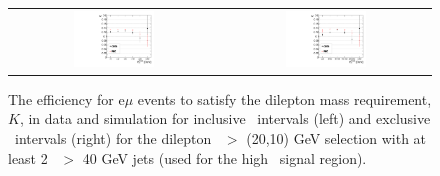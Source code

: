 \clearpage

\begin{figure}[!ht]
\begin{center}
\begin{tabular}{cc}
\includegraphics[width=0.4\textwidth]{plots/extractK_inclusive_pt2010_92fb.pdf} &
\includegraphics[width=0.4\textwidth]{plots/extractK_exclusive_pt2010_92fb.pdf} \\
\end{tabular}
\caption{\label{fig:K_incl_highmet}
The efficiency for e$\mu$ events to satisfy the dilepton mass requirement, $K$, in data and simulation for inclusive \MET\ intervals 
(left) and exclusive \MET\ intervals (right) for the dilepton \pt\ $>$ (20,10) GeV selection with at least 2 \pt\ $>$ 40 GeV jets
(used for the high \MET\ signal region). 
}
\end{center}
\end{figure}

